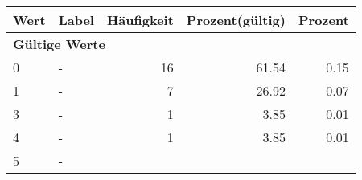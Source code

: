      \begin{longtable}{lXrrr}
     \toprule
     \textbf{Wert} & \textbf{Label} & \textbf{Häufigkeit} & \textbf{Prozent(gültig)} & \textbf{Prozent} \\
     \endhead
     \midrule
     \multicolumn{5}{l}{\textbf{Gültige Werte}}\\

     0 &
     \multicolumn{1}{X}{ -  } &


       \num{16} &
       \num[round-mode=places,round-precision=2]{61.54} &
         \num[round-mode=places,round-precision=2]{0.15} \\

     1 &
     \multicolumn{1}{X}{ -  } &


       \num{7} &
       \num[round-mode=places,round-precision=2]{26.92} &
         \num[round-mode=places,round-precision=2]{0.07} \\

     3 &
     \multicolumn{1}{X}{ -  } &


       \num{1} &
       \num[round-mode=places,round-precision=2]{3.85} &
         \num[round-mode=places,round-precision=2]{0.01} \\

     4 &
     \multicolumn{1}{X}{ -  } &


       \num{1} &
       \num[round-mode=places,round-precision=2]{3.85} &
         \num[round-mode=places,round-precision=2]{0.01} \\

     5 &
     \multicolumn{1}{X}{ -  } &



\end{longtable}
